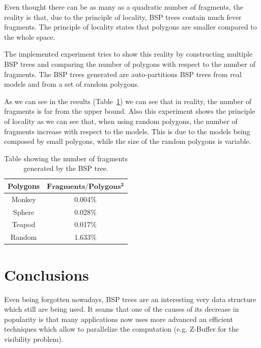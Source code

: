 \documentclass{article}
\begin{document}
Even thought there can be as many as a quadratic number of fragments, the reality is that, due to the principle of locality, BSP trees contain much fever fragments. The principle of locality states that polygons are smaller compared to the whole space.

The implemented experiment tries to show this reality by constructing multiple BSP trees and comparing the number of polygons with respect to the number of fragments. The BSP trees generated are auto-partitions BSP trees from real models and from a set of random polygons.

As we can see in the results (Table~\ref{results}) we can see that in reality, the number of fragments is far from the upper bound. Also this experiment shows the principle of locality as we can see that, when using random polygons, the number of fragments increase with respect to the models. This is due to the models being composed by small polygons, while the size of the random polygons is variable.

\begin{table}
\centering
\begin{tabular}{|c|c|}
\hline
\textbf{Polygons} & $\boldsymbol{Fragments/Polygons^2}$ \\
\hline\hline
Monkey & 0.004\% \\
Sphere & 0.028\% \\
Teapod & 0.017\% \\
Random & 1.633\% \\
\hline
\end{tabular}
\caption{Table showing the number of fragments generated by the BSP tree.}
\label{results}
\end{table}

\section*{Conclusions}
Even being forgotten nowadays, BSP trees are an interesting very data structure which still are being used. It seams that one of the causes of its decrease in popularity is that many applications now uses more advanced an efficient techniques which allow to parallelize the computation (e.g. Z-Buffer for the visibility problem).



\end{document}
